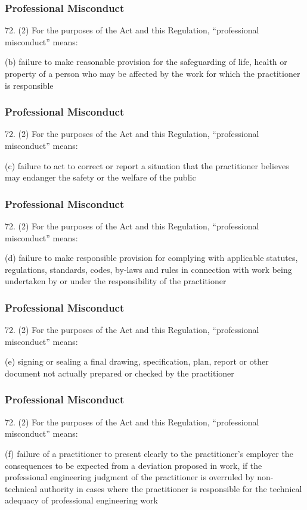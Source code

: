 \begin{frame}
\frametitle{Professional Misconduct}

72. (2) For the purposes of the Act and this Regulation, ``professional misconduct'' means:

(b) failure to make reasonable provision for the safeguarding of  life, health or property of a person who may be affected by the  work for which the practitioner is responsible

\end{frame}


\begin{frame}
\frametitle{Professional Misconduct}

72. (2) For the purposes of the Act and this Regulation, ``professional misconduct'' means:

(c) failure to act to correct or report a situation that the practitioner  believes may endanger the safety or the welfare of the public

\end{frame}

\begin{frame}
\frametitle{Professional Misconduct}

72. (2) For the purposes of the Act and this Regulation, ``professional misconduct'' means:

(d) failure to make responsible provision for complying with  applicable statutes, regulations, standards, codes, by-laws and  rules in connection with work being undertaken by or under the  responsibility of the practitioner

\end{frame}

\begin{frame}
\frametitle{Professional Misconduct}

72. (2) For the purposes of the Act and this Regulation, ``professional misconduct'' means:

(e) signing or sealing a final drawing, specification, plan, report or  other document not actually prepared or checked by the  practitioner

\end{frame}


\begin{frame}
\frametitle{Professional Misconduct}

72. (2) For the purposes of the Act and this Regulation, ``professional misconduct'' means:

(f)  failure of a practitioner to present clearly to the practitioner's  employer the consequences to be expected from a deviation  proposed in work, if the professional engineering judgment of  the practitioner is overruled by non-technical authority in cases  where the practitioner is responsible for the technical adequacy  of professional engineering work

\end{frame}

